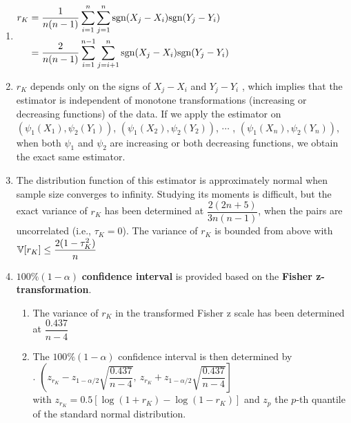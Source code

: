 \begin{enumerate}
    \item
    $
        \begin{aligned}
            r_K
            &= \dfrac{1}{n(n - 1)} \displaystyle\sum^n _{i=1} \displaystyle\sum^n _{j=1} \text{sgn}(X_j - X_i )\text{sgn}(Y_j - Y_i )\\
            &= \dfrac{2}{n(n - 1)} \displaystyle\sum^{n-1}_{i=1} \displaystyle\sum^n  _{j=i+1} \text{sgn}(X_j - X_i )\text{sgn}(Y_j - Y_i )
        \end{aligned}
    $
    \hfill \cite{statistics/book/Statistics-for-Data-Scientists/Maurits-Kaptein}

    \item  $r_K$ depends only on the signs of $X_j - X_i$ and $Y_j - Y_i$ , which implies that the estimator is independent of monotone transformations (increasing or decreasing functions) of the data.
    If we apply the estimator on $(\psi_1(X_1), \psi_2(Y_1))$, $(\psi_1(X_2), \psi_2(Y_2))$, $\cdots$ , $(\psi_1(X_n ), \psi_2(Y_n ))$, when both $\psi_1$ and $\psi_2$ are increasing or both decreasing functions, we obtain the exact same estimator.
    \hfill \cite{statistics/book/Statistics-for-Data-Scientists/Maurits-Kaptein}

    \item The distribution function of this estimator is approximately normal when sample size converges to infinity.
    Studying its moments is difficult, but the exact variance of $r_K$ has been determined at $\dfrac{2(2n + 5)}{3n(n - 1)}$, when the pairs are uncorrelated (i.e., $\tau_K = 0$).
    The variance of $r_K$ is bounded from above with $\mathbb{V}[r_K] \leq \dfrac{2(1 - \tau^2_K )}{n}$
    \hfill \cite{statistics/book/Statistics-for-Data-Scientists/Maurits-Kaptein}

    \item  $100\%(1 - \alpha)$ \textbf{confidence interval} is provided based on the \textbf{Fisher z-transformation}.
    \hfill \cite{statistics/book/Statistics-for-Data-Scientists/Maurits-Kaptein}
    \begin{enumerate}
        \item The variance of $r_K$ in the transformed Fisher z scale has been determined at $\dfrac{0.437}{n - 4}$
        \hfill \cite{statistics/book/Statistics-for-Data-Scientists/Maurits-Kaptein}

        \item The $100\%(1 - \alpha)$ confidence interval is then determined by
        \hfill \cite{statistics/book/Statistics-for-Data-Scientists/Maurits-Kaptein}
        \\[0.3cm]
        .\hfill
        $
            \left(
                z_{r_K} - z_{1-\alpha/2} \sqrt{\dfrac{0.437}{n - 4}},
                \ z_{r_K} + z_{1-\alpha/2} \sqrt{\dfrac{0.437}{n - 4}}
            \right]
        $
        \hfill \cite{statistics/book/Statistics-for-Data-Scientists/Maurits-Kaptein}
        \\[0.3cm]
        with $z_{r_K} = 0.5[\log(1 + r_K ) - \log(1 - r_K )]$ and $z_p$ the $p$-th quantile of the standard normal distribution.
        \hfill \cite{statistics/book/Statistics-for-Data-Scientists/Maurits-Kaptein}


\end{enumerate}
\end{enumerate}
